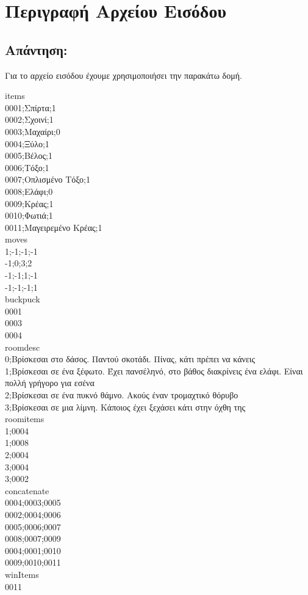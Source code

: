 \newpage
\section{Περιγραφή Αρχείου Εισόδου}
\subsection*{Απάντηση:}

\noindent
Για το αρχείο εισόδου έχουμε χρησιμοποιήσει την παρακάτω δομή.

\noindent
items\\
0001;Σπίρτα;1\\
0002;Σχοινί;1\\
0003;Μαχαίρι;0\\
0004;Ξύλο;1\\
0005;Βέλος;1\\
0006;Τόξο;1\\
0007;Οπλισμένο Τόξο;1\\
0008;Ελάφι;0\\
0009;Κρέας;1\\
0010;Φωτιά;1\\
0011;Μαγειρεμένο Κρέας;1\\
moves\\
1;-1;-1;-1\\
-1;0;3;2\\
-1;-1;1;-1\\
-1;-1;-1;1\\
buckpuck\\
0001\\
0003\\
0004\\
roomdesc\\
0;Βρίσκεσαι στο δάσος. Παντού σκοτάδι. Πίνας, κάτι πρέπει να κάνεις\\
1;Βρίσκεσαι σε ένα ξέφωτο. Έχει πανσέληνό, στο βάθος διακρίνεις ένα ελάφι. Είναι πολλή γρήγορο για εσένα\\
2;Βρίσκεσαι σε ένα πυκνό θάμνο. Ακούς έναν τρομαχτικό θόρυβο\\
3;Βρίσκεσαι σε μια λίμνη. Κάποιος έχει ξεχάσει κάτι στην όχθη της\\
roomitems\\
1;0004\\
1;0008\\
2;0004\\
3;0004\\
3;0002\\
\newpage
concatenate\\
0004;0003;0005\\
0002;0004;0006\\
0005;0006;0007\\
0008;0007;0009\\
0004;0001;0010\\
0009;0010;0011\\
winItems\\
0011\\

